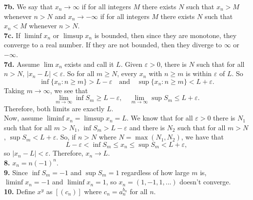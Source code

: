 \documentclass{article}
\newcommand{\eps}{\varepsilon}
\begin{document}
\textbf{7b.} We say that $x_n \to \infty$ if for all integers $M$ there exists $N$ such that $x_n > M$ whenever $n > N$ and $x_n \to -\infty$ if for all integers $M$ there exists $N$ such that $x_n < M$ whenever $n > N$. \\

\textbf{7c.} If $\liminf x_n$ or $\limsup x_n$ is bounded, then since they are monotone, they converge to a real number. If they are not bounded, then they diverge to $\infty$ or $-\infty$. \\

\textbf{7d.} Assume $\lim x_n$ exists and call it $L$. Given $\eps > 0$, there is $N$ such that for all $n > N$, $|x_n - L| < \eps$. So for all $m \ge N$, every $x_n$ with $n \ge m$ is within $\eps$ of $L$. So
$$\inf\{x_n : n \ge m\} > L - \eps \quad \text{and} \quad \sup\{x_n : 
 n \ge m\} < L + \eps.$$
Taking $m \to \infty$, we see that
$$\lim_{m \to \infty} \inf S_m \ge L - \eps, \quad \lim_{m \to \infty} \sup S_m \le L + \eps.$$
Therefore, both limits are exactly $L$. \\

Now, assume $\liminf x_n = \limsup x_n = L$. We know that for all $\eps > 0$ there is $N_1$ such that for all $m > N_1$, $\inf S_m > L - \eps$ and there is $N_2$ such that for all $m > N$, $\sup S_m < L + \eps$. So, if $n > N$ where $N = \max(N_1, N_2)$, we have that
$$L - \eps < \inf S_m \le x_n \le \sup S_m < L + \eps,$$
so $|x_n - L| < \eps$. Therefore, $x_n \to L$. \\

\textbf{8.} $x_n = n(-1)^n$. \\

\textbf{9.} Since $\inf S_m = -1$ and $\sup S_m = 1$ regardless of how large $m$ is, $\liminf x_n = -1$ and $\liminf x_n = 1$, so $x_n = (1, -1, 1, ...)$ doesn't converge. \\

\textbf{10.} Define $x^y$ as $[(c_n)]$ where $c_n = a_n^{b_n}$ for all $n$.
\end{document}
